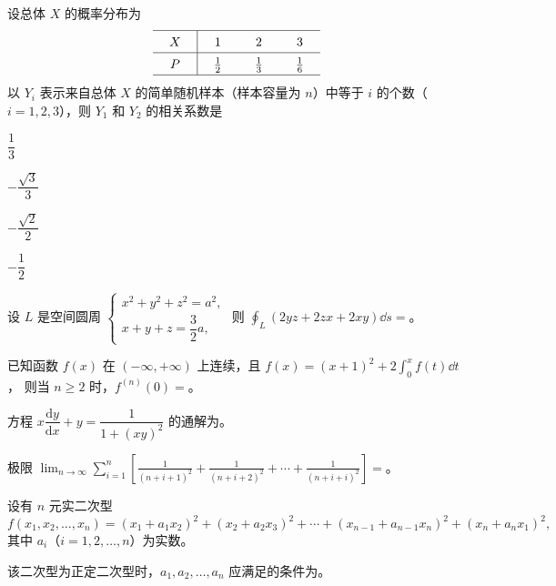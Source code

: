 \begin{question}[index=10]
设总体 $X$ 的概率分布为
\[
\setlength{\arraycolsep}{13pt}
\renewcommand{\arraystretch}{1.45}
\begin{array}{c|ccc}
\hline
X & 1 & 2 & 3\\ \hline
P & \frac12 & \frac13 & \frac16\\ \hline
\end{array}
\]
以 $Y_i$ 表示来自总体 $X$ 的简单随机样本（样本容量为 $n$）中等于 $i$ 的个数（$i=1,2,3$），则 $Y_1$ 和 $Y_2$ 的相关系数是\paren
\begin{choices}[columns=4]
\item $\dfrac13$
\item $-\dfrac{\sqrt{3}}{3}$
\item $-\dfrac{\sqrt{2}}{2}$
\item $-\dfrac12$
\end{choices}
\end{question}

\fillheading

\begin{question}[index=11]
设 $L$ 是空间圆周 $\begin{cases}
x^2+y^2+z^2=a^2,\\
x+y+z=\dfrac32a,
\end{cases}$ 则
$\displaystyle\oint_L(2yz+2zx+2xy)\dd s=$\fillin。
\end{question}

\begin{question}[index=12]
已知函数 $f(x)$ 在 $(-\infty,+\infty)$ 上连续，且 $f(x)=(x+1)^2+2\displaystyle\int_0^x f(t)\dd t$，
则当 $n\ge 2$ 时，$f^{(n)}(0)=$\fillin。
\end{question}

\begin{question}[index=13]
方程 $x\dfrac{\mathrm{d}y}{\mathrm{d}x}+y=\dfrac{1}{1+(xy)^2}$ 的通解为\fillin。
\end{question}

\begin{question}[index=14]
极限
$\displaystyle\lim_{n\to\infty}\sum_{i=1}^{n}\left[\frac{1}{(n+i+1)^2}+\frac{1}{(n+i+2)^2}+\cdots+\frac{1}{(n+i+i)^2}\right]=$\fillin。
\end{question}

\begin{question}[index=15]
设有 $n$ 元实二次型
\[
f(x_1,x_2,\ldots,x_n)=(x_1+a_1x_2)^2+(x_2+a_2x_3)^2+\cdots
+(x_{n-1}+a_{n-1}x_n)^2+(x_n+a_nx_1)^2,
\]
其中 $a_i$（$i=1,2,\ldots,n$）为实数。\par
该二次型为正定二次型时，$a_1,a_2,\ldots,a_n$ 应满足的条件为\fillin。
\end{question}

